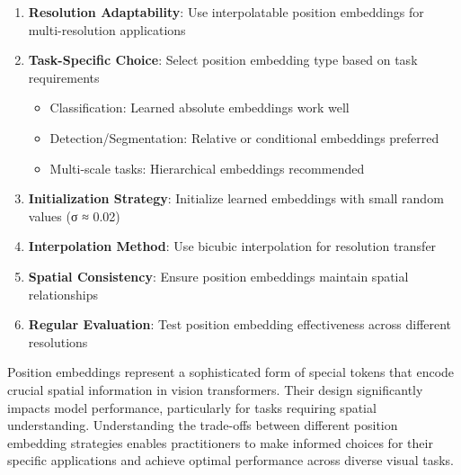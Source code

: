 \begin{enumerate}
\item \textbf{Resolution Adaptability}: Use interpolatable position embeddings for multi-resolution applications
\item \textbf{Task-Specific Choice}: Select position embedding type based on task requirements
    \begin{itemize}
    \item Classification: Learned absolute embeddings work well
    \item Detection/Segmentation: Relative or conditional embeddings preferred
    \item Multi-scale tasks: Hierarchical embeddings recommended
    \end{itemize}
\item \textbf{Initialization Strategy}: Initialize learned embeddings with small random values (σ ≈ 0.02)
\item \textbf{Interpolation Method}: Use bicubic interpolation for resolution transfer
\item \textbf{Spatial Consistency}: Ensure position embeddings maintain spatial relationships
\item \textbf{Regular Evaluation}: Test position embedding effectiveness across different resolutions
\end{enumerate}

Position embeddings represent a sophisticated form of special tokens that encode crucial spatial information in vision transformers. Their design significantly impacts model performance, particularly for tasks requiring spatial understanding. Understanding the trade-offs between different position embedding strategies enables practitioners to make informed choices for their specific applications and achieve optimal performance across diverse visual tasks.